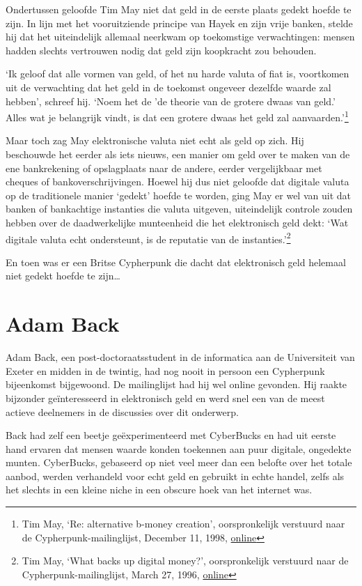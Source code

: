 \documentclass[smalldemyvopaper,11pt,twoside,onecolumn,openright,extrafontsizes,hidelinks]{memoir}
\begin{document}
Ondertussen geloofde Tim May niet dat geld in de eerste plaats gedekt
hoefde te zijn. In lijn met het vooruitziende principe van Hayek en zijn
vrije banken, stelde hij dat het uiteindelijk allemaal neerkwam op
toekomstige verwachtingen: mensen hadden slechts vertrouwen nodig dat
geld zijn koopkracht zou behouden.

`Ik geloof dat alle vormen van geld, of het nu harde valuta of fiat is,
voortkomen uit de verwachting dat het geld in de toekomst ongeveer
dezelfde waarde zal hebben', schreef hij. `Noem het de 'de theorie van
de grotere dwaas van geld.' Alles wat je belangrijk vindt, is dat een
grotere dwaas het geld zal aanvaarden.'\footnote{Tim May, `Re:
  alternative b-money creation', oorspronkelijk verstuurd naar de
  Cypherpunk-mailinglijst, December 11, 1998,
  \href{https://cypherpunks.venona.com/date/1998/12/msg00455.html}{online}}

Maar toch zag May elektronische valuta niet echt als geld op zich. Hij
beschouwde het eerder als iets nieuws, een manier om geld over te maken
van de ene bankrekening of opslagplaats naar de andere, eerder
vergelijkbaar met cheques of bankoverschrijvingen. Hoewel hij dus niet
geloofde dat digitale valuta op de traditionele manier `gedekt' hoefde
te worden, ging May er wel van uit dat banken of bankachtige instanties
die valuta uitgeven, uiteindelijk controle zouden hebben over de
daadwerkelijke munteenheid die het elektronisch geld dekt: `Wat digitale
valuta echt ondersteunt, is de reputatie van de instanties.'\footnote{Tim
  May, `What backs up digital money?', oorspronkelijk verstuurd naar de
  Cypherpunk-mailinglijst, March 27, 1996,
  \href{https://cypherpunks.venona.com/date/1996/03/msg01576.html}{online}}

En toen was er een Britse Cypherpunk die dacht dat elektronisch geld
helemaal niet gedekt hoefde te zijn\ldots{}

\section{Adam Back}\label{adam-back}

Adam Back, een post-doctoraatsstudent in de informatica aan de
Universiteit van Exeter en midden in de twintig, had nog nooit in
persoon een Cypherpunk bijeenkomst bijgewoond. De mailinglijst had hij
wel online gevonden. Hij raakte bijzonder geïnteresseerd in elektronisch
geld en werd snel een van de meest actieve deelnemers in de discussies
over dit onderwerp.

Back had zelf een beetje geëxperimenteerd met CyberBucks en had uit
eerste hand ervaren dat mensen waarde konden toekennen aan puur
digitale, ongedekte munten. CyberBucks, gebaseerd op niet veel meer dan
een belofte over het totale aanbod, werden verhandeld voor echt geld en
gebruikt in echte handel, zelfs als het slechts in een kleine niche in
een obscure hoek van het internet was.
\end{document}

